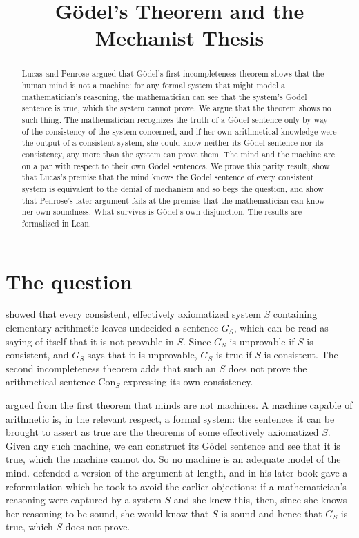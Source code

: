\documentclass{situationist-preprint}
\title{G\"odel's Theorem and the Mechanist Thesis}
\begin{document}
\maketitle

\begin{abstract}
Lucas and Penrose argued that G\"odel's first incompleteness theorem shows that the human mind is not a machine: for any formal system that might model a mathematician's reasoning, the mathematician can see that the system's G\"odel sentence is true, which the system cannot prove. We argue that the theorem shows no such thing. The mathematician recognizes the truth of a G\"odel sentence only by way of the consistency of the system concerned, and if her own arithmetical knowledge were the output of a consistent system, she could know neither its G\"odel sentence nor its consistency, any more than the system can prove them. The mind and the machine are on a par with respect to their own G\"odel sentences. We prove this parity result, show that Lucas's premise that the mind knows the G\"odel sentence of every consistent system is equivalent to the denial of mechanism and so begs the question, and show that Penrose's later argument fails at the premise that the mathematician can know her own soundness. What survives is G\"odel's own disjunction. The results are formalized in Lean.
\end{abstract}

\section{The question}

\citet{Godel1931} showed that every consistent, effectively axiomatized system $S$ containing elementary arithmetic leaves undecided a sentence $G_S$, which can be read as saying of itself that it is not provable in $S$. Since $G_S$ is unprovable if $S$ is consistent, and $G_S$ says that it is unprovable, $G_S$ is true if $S$ is consistent. The second incompleteness theorem adds that such an $S$ does not prove the arithmetical sentence $\mathrm{Con}_S$ expressing its own consistency.

\citet{Lucas1961} argued from the first theorem that minds are not machines. A machine capable of arithmetic is, in the relevant respect, a formal system: the sentences it can be brought to assert as true are the theorems of some effectively axiomatized $S$. Given any such machine, we can construct its G\"odel sentence and see that it is true, which the machine cannot do. So no machine is an adequate model of the mind. \citet{Penrose1989,Penrose1994} defended a version of the argument at length, and in his later book gave a reformulation which he took to avoid the earlier objections: if a mathematician's reasoning were captured by a system $S$ and she knew this, then, since she knows her reasoning to be sound, she would know that $S$ is sound and hence that $G_S$ is true, which $S$ does not prove.
\end{document}
